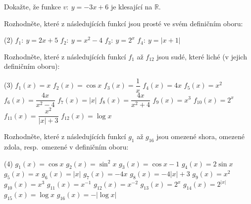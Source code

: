 \documentclass[12pt,a4paper]{article}
\begin{document}
\begin{exercise}
    Dokažte, že funkce \(v:\ y=-3x+6\) je klesající na \(\mathbb{R}\).
\end{exercise}


\setcounter{section}{3}
\begin{exercise}
    Rozhodněte, které z následujících funkcí jsou prosté ve svém definičním oboru:
    \begin{tasks}(2)
        \task \(f_{1}:~y=2x+5\)
        \task \(f_{2}:~y=x^{2}-4\)
        \task \(f_{3}:~y=2^{x}\)
        \task \(f_{4}:~y=|x+1|\)
    \end{tasks}
\end{exercise}


\setcounter{section}{4}
\begin{exercise}
    Rozhodněte, které z následujících funkcí \(f_{1}\) až \(f_{12}\) jsou sudé, které liché (v jejich definičním oboru):
    \begin{tasks}(3)
        \task \(f_{1}(x)=x\)
        \task \(f_{2}(x)=\cos x\)
        \task \(f_{3}(x)=\dfrac{1}{x}\)
        \task \(f_{4}(x)=4x\)
        \task \(f_{5}(x)=x^{2}\)
        \task \(f_{6}(x)=\dfrac{4x}{x^{2}-4}\)
        \task \(f_{7}(x)=|x|\)
        \task \(f_{8}(x)=\dfrac{4x}{x^{2}+4}\)
        \task \(f_{9}(x)=x^{3}\)
        \task \(f_{10}(x)=2^{x}\)
        \task \(f_{11}(x)=\dfrac{x^{2}}{|x|+3}\)
        \task \(f_{12}(x)=\log x\)
    \end{tasks}
\end{exercise}


\setcounter{section}{5}
\begin{exercise}
    Rozhodněte, které z následujících funkcí \(g_{1}\) až \(g_{16}\) jsou omezené shora, omezené zdola, resp.\ omezené v definičním oboru:
    \begin{tasks}(4)
        \task \(g_{1}(x)=\cos x\)
        \task \(g_{2}(x)=\sin^{2}x\)
        \task \mbox{$g_{3}(x)=\cos x-1$}
        \task \(g_{4}(x)=2\sin x\)
        \task \(g_{5}(x)=x\)
        \task \(g_{6}(x)=|x|\)
        \task \(g_{7}(x)=-4x\)
        \task \mbox{$g_{8}(x)=-4|x|+3$}
        \task \(g_{9}(x)=x^{2}\)
        \task \(g_{10}(x)=x^{3}\)
        \task \(g_{11}(x)=x^{-1}\)
        \task \(g_{12}(x)=x^{-2}\)
        \task \(g_{13}(x)=2^{x}\)
        \task \(g_{14}(x)=2^{|x|}\)
        \task \(g_{15}(x)=\log x\)
        \task \(g_{16}(x)=-|\log x|\)
    \end{tasks}
\end{exercise}
\end{document}
